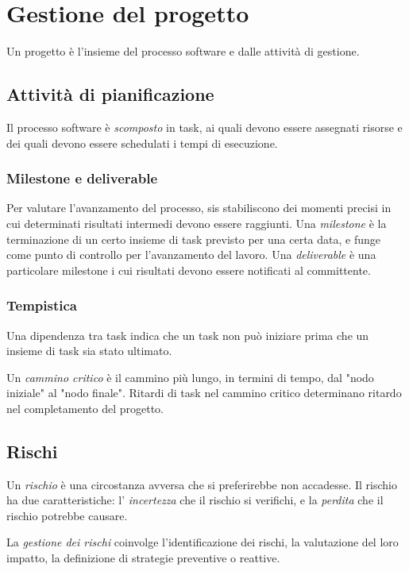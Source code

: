 \documentclass[11pt]{article}
\begin{document}
\section{Gestione del progetto}
Un progetto è l'insieme del processo software e dalle attività di gestione.
\subsection{Attività di pianificazione}
Il processo software è \textit{scomposto} in task, ai quali devono essere assegnati risorse e dei quali devono essere 
schedulati i tempi di esecuzione.
\subsubsection*{Milestone e deliverable}
Per valutare l'avanzamento del processo, sis stabiliscono dei momenti precisi in cui determinati risultati intermedi devono 
essere raggiunti.
Una \textit{milestone} è la terminazione di un certo insieme di task previsto per una certa data, e funge come punto di 
controllo per l'avanzamento del lavoro. Una \textit{deliverable} è una particolare milestone i cui risultati devono essere 
notificati al committente.
\subsubsection*{Tempistica}
Una dipendenza tra task indica che un task non può iniziare prima che un insieme di task sia stato ultimato.

Un \textit{cammino critico} è il cammino più lungo, in termini di tempo, dal "nodo iniziale" al "nodo finale". Ritardi 
di task nel cammino critico determinano ritardo nel completamento del progetto.
\subsection{Rischi}
Un \textit{rischio} è una circostanza avversa che si preferirebbe non accadesse. Il rischio ha due caratteristiche: l'
\textit{incertezza} che il rischio si verifichi, e la \textit{perdita} che il rischio potrebbe causare.

La \textit{gestione dei rischi} coinvolge l'identificazione dei rischi, la valutazione del loro impatto, la definizione 
di strategie preventive o reattive.
\end{document}
